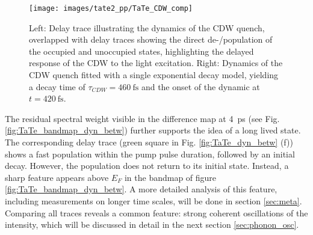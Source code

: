 \begin{figure}[t!]
	\centering
	\texttt{[image: images/tate2\_pp/TaTe\_CDW\_comp]}
	\caption{Left: Delay trace illustrating the dynamics of the CDW quench, overlapped with delay traces showing the direct de-/population of the occupied and unoccupied states, highlighting the delayed response of the CDW to the light excitation. Right: Dynamics of the CDW quench fitted with a single exponential decay model, yielding a decay time of $\tau_{CDW}=\qty{460}{\femto\second}$ and the onset of the dynamic at $t=\qty{420}{\femto\second}$.}
	\label{fig:TaTe_CDW_comp}
\end{figure}

The residual spectral weight visible in the difference map at \qty{4}{\pico\second} (see Fig. \ref{fig:TaTe_bandmap_dyn_betw}) further supports the idea of a long lived state.
The corresponding delay trace (green square in Fig. \ref{fig:TaTe_dyn_betw} (f)) shows a fast population within the pump pulse duration, followed by an initial decay.
However, the population does not return to its initial state.
Instead, a sharp feature appears above $E_F$ in the bandmap of figure \ref{fig:TaTe_bandmap_dyn_betw}.
A more detailed analysis of this feature, including measurements on longer time scales, will be done in section \ref{sec:meta}.
Comparing all traces reveals a common feature: strong coherent oscillations of the intensity, which will be discussed in detail in the next section \ref{sec:phonon_osc}.


